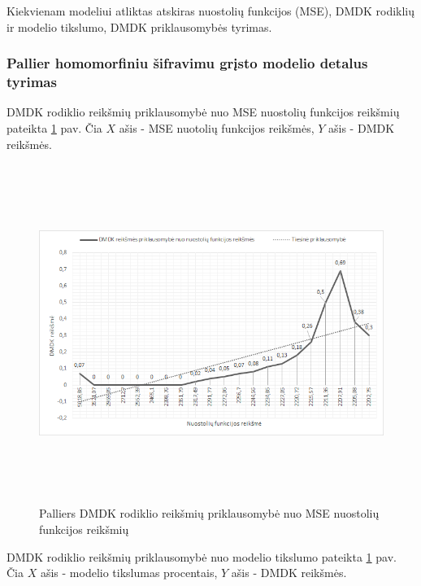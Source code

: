 \documentclass{VUMIFInfBakalaurinis}
\begin{document}
\par Kiekvienam modeliui atliktas atskiras nuostolių funkcijos (MSE), DMDK rodiklių ir modelio tikslumo, DMDK priklausomybės tyrimas.

\subsubsection{Pallier homomorfiniu šifravimu grįsto modelio detalus tyrimas}
\par DMDK rodiklio reikšmių priklausomybė nuo MSE nuostolių funkcijos reikšmių pateikta \ref{fig:Palliers DMDK rodiklio reikšmių priklausomybė nuo MSE nuostolių funkcijos reikšmių} pav. Čia $X$ ašis - MSE nuotolių funkcijos reikšmės, $Y$ ašis - DMDK reikšmės. 

\begin{figure}[h]
  \centering
  \includegraphics[width=14cm,height=11cm,keepaspectratio]{img/pal_tyr_1.png}
  \caption{Palliers DMDK rodiklio reikšmių priklausomybė nuo MSE nuostolių funkcijos reikšmių}
  \label{fig:Palliers DMDK rodiklio reikšmių priklausomybė nuo MSE nuostolių funkcijos reikšmių}
\end{figure}

\par DMDK rodiklio reikšmių priklausomybė nuo modelio tikslumo pateikta \ref{fig:Palliers DMDK rodiklio reikšmių priklausomybė nuo MSE nuostolių funkcijos reikšmių} pav. Čia $X$ ašis - modelio tikslumas procentais, $Y$ ašis - DMDK reikšmės.
\end{document}

